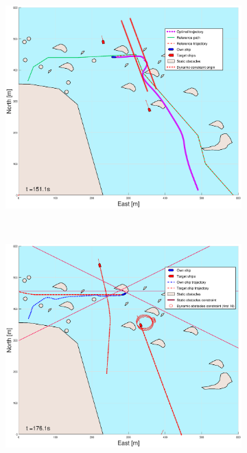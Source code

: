 \begin{figure}[ht]
\begin{subfigure}[b]{0.494\textwidth}
        \subcaption{}
    \end{subfigure}
    \hfill
    \begin{subfigure}[b]{0.494\textwidth}
        \centering
        \includegraphics[width=\textwidth]{Images/Figures/skjergard_m_trafikk_NEW/_Simple_1fig999_time=151}
        \subcaption{}
    \end{subfigure}
    \hfill
    \\
    \begin{subfigure}[b]{0.494\textwidth}
        \centering
        \includegraphics[width=\textwidth]{Images/Figures/skjergard_m_trafikk_NEW/_Simple_1fig1_time=176}

\end{subfigure}
\end{figure}
